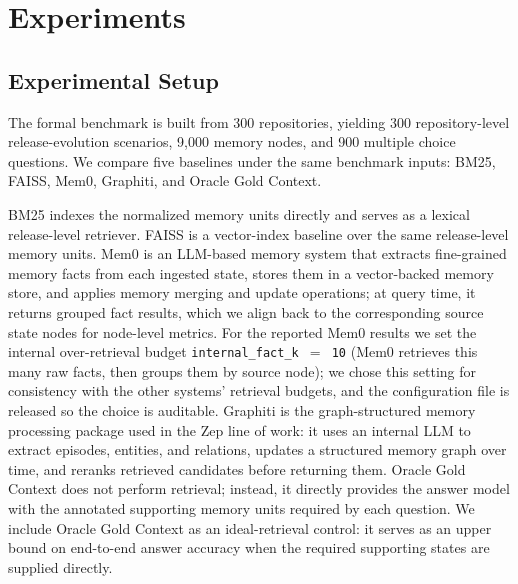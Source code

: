 \section{Experiments}

\subsection{Experimental Setup}

The formal benchmark is built from 300 repositories, yielding 300 repository-level release-evolution scenarios, 9{,}000 memory nodes, and 900 multiple choice questions. We compare five baselines under the same benchmark inputs: BM25, FAISS, Mem0, Graphiti, and Oracle Gold Context.

BM25 indexes the normalized memory units directly and serves as a lexical release-level retriever. FAISS is a vector-index baseline over the same release-level memory units. Mem0 is an LLM-based memory system that extracts fine-grained memory facts from each ingested state, stores them in a vector-backed memory store, and applies memory merging and update operations; at query time, it returns grouped fact results, which we align back to the corresponding source state nodes for node-level metrics. For the reported Mem0 results we set the internal over-retrieval budget \texttt{internal\_fact\_k\,$=$\,10} (Mem0 retrieves this many raw facts, then groups them by source node); we chose this setting for consistency with the other systems' retrieval budgets, and the configuration file is released so the choice is auditable. Graphiti is the graph-structured memory processing package used in the Zep line of work: it uses an internal LLM to extract episodes, entities, and relations, updates a structured memory graph over time, and reranks retrieved candidates before returning them. Oracle Gold Context does not perform retrieval; instead, it directly provides the answer model with the annotated supporting memory units required by each question. We include Oracle Gold Context as an ideal-retrieval control: it serves as an upper bound on end-to-end answer accuracy when the required supporting states are supplied directly.

